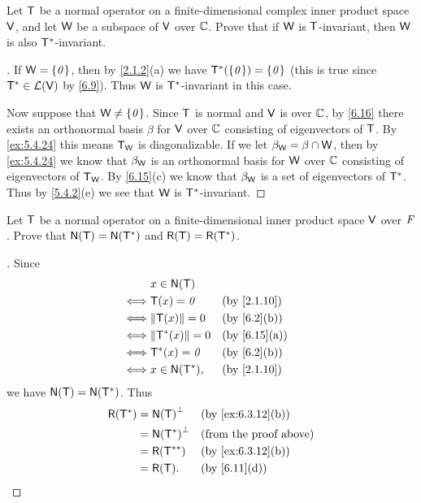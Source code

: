\begin{ex}\label{ex:6.4.8}
  Let \(\mathsf{T}\) be a normal operator on a finite-dimensional complex inner product space \(\mathsf{V}\), and let \(\mathsf{W}\) be a subspace of \(\mathsf{V}\) over \(\mathbb{C}\).
  Prove that if \(\mathsf{W}\) is \(\mathsf{T}\)-invariant, then \(\mathsf{W}\) is also \(\mathsf{T}^*\)-invariant.
\end{ex}

\begin{proof}[]
  If \(\mathsf{W} = \left\lbrace\mathit{0}\right\rbrace\), then by \cref{2.1.2}(a) we have \(\mathsf{T}^*(\left\lbrace\mathit{0}\right\rbrace) = \left\lbrace\mathit{0}\right\rbrace\) (this is true since \(\mathsf{T}^* \in \mathcal{L}(\mathsf{V})\) by \cref{6.9}).
  Thus \(\mathsf{W}\) is \(\mathsf{T}^*\)-invariant in this case.

  Now suppose that \(\mathsf{W} \neq \left\lbrace\mathit{0}\right\rbrace\).
  Since \(\mathsf{T}\) is normal and \(\mathsf{V}\) is over \(\mathbb{C}\), by \cref{6.16} there exists an orthonormal basis \(\beta\) for \(\mathsf{V}\) over \(\mathbb{C}\) consisting of eigenvectors of \(\mathsf{T}\).
  By \cref{ex:5.4.24} this means \(\mathsf{T}_{\mathsf{W}}\) is diagonalizable.
  If we let \(\beta_{\mathsf{W}} = \beta \cap \mathsf{W}\), then by \cref{ex:5.4.24} we know that \(\beta_{\mathsf{W}}\) is an orthonormal basis for \(\mathsf{W}\) over \(\mathbb{C}\) consisting of eigenvectors of \(\mathsf{T}_{\mathsf{W}}\).
  By \cref{6.15}(c) we know that \(\beta_{\mathsf{W}}\) is a set of eigenvectors of \(\mathsf{T}^*\).
  Thus by \cref{5.4.2}(e) we see that \(\mathsf{W}\) is \(\mathsf{T}^*\)-invariant.
\end{proof}

\begin{ex}\label{ex:6.4.9}
  Let \(\mathsf{T}\) be a normal operator on a finite-dimensional inner product space \(\mathsf{V}\) over \(\mathit{F}\).
  Prove that \(\ns{\T} = \ns{\T^*}\) and \(\rg{\T} = \rg{\T^*}\).
\end{ex}

\begin{proof}[]
  Since
  \begin{align*}
         & x \in \ns{\T}                        \\
    \iff & \T(x) = \zv        &  & \by{2.1.10}  \\
    \iff & \norm{\T(x)} = 0   &  & \by{6.2}[b]  \\
    \iff & \norm{\T^*(x)} = 0 &  & \by{6.15}[a] \\
    \iff & \T^*(x) = \zv      &  & \by{6.2}[b]  \\
    \iff & x \in \ns{\T^*},   &  & \by{2.1.10}
  \end{align*}
  we have \(\ns{\T} = \ns{\T^*}\).
  Thus
  \begin{align*}
    \rg{\T^*} & = \ns{\T}^{\perp}   &  & \by{ex:6.3.12}[b]             \\
              & = \ns{\T^*}^{\perp} &  & \text{(from the proof above)} \\
              & = \rg{\T^{**}}      &  & \by{ex:6.3.12}[b]             \\
              & = \rg{\T}.          &  & \by{6.11}[d]
  \end{align*}
\end{proof}

